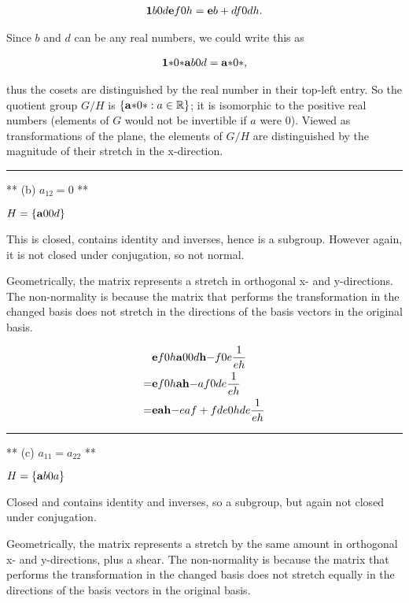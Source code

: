 \begin{align*}
\mathbf{1}{b}
    {0}{d} \mathbf{e}{f}
               {0}{h} = \mathbf{e}{b + df}
                            {0}{dh    }.
\end{align*}

Since $b$ and $d$ can be any real numbers, we could write this as

\begin{align*}
\mathbf{1}{*}
    {0}{*} \mathbf{a}{b}
               {0}{d} = \mathbf{a}{*}
                            {0}{*},
\end{align*}

thus the cosets are distinguished by the real number in their top-left
entry. So the quotient group $G/H$ is $\left\{\tiny{\mathbf{a}{*}{0}{*}}: a \in
\mathbb{R}\right\}$; it is isomorphic to the positive real numbers (elements of $G$
would not be invertible if $a$ were $0$). Viewed as transformations of the
plane, the elements of $G/H$ are distinguished by the magnitude of their
stretch in the x-direction.

\hrule
** (b) $a_{12} = 0$ **

$H = \left\{ \mathbf{a}{0}
                 {0}{d} \right\}$

This is closed, contains identity and inverses, hence is a subgroup. However
again, it is not closed under conjugation, so not normal.

Geometrically, the matrix represents a stretch in orthogonal x- and
y-directions. The non-normality is because the matrix that performs the
transformation in the changed basis does not stretch in the directions of the
basis vectors in the original basis.

\begin{align*}
&\mathbf{e}{f}
     {0}{h} \mathbf{a}{0}
                {0}{d} \mathbf{h}{-f}
                           {0}{e } \frac{1}{eh} \\
= &\mathbf{e}{f}
       {0}{h} \mathbf{ah}{-af}
                  {0 }{de } \frac{1}{eh} \\
= &\mathbf{eah}{-eaf + fde}
       {0  }{hde       } \frac{1}{eh}
\end{align*}

\hrule
** (c) $a_{11} = a_{22}$ **

$H = \left\{ \mathbf{a}{b}
                 {0}{a} \right\}$

Closed and contains identity and inverses, so a subgroup, but again not closed
under conjugation.

Geometrically, the matrix represents a stretch by the same amount in orthogonal
x- and y-directions, plus a shear. The non-normality is because the matrix that
performs the transformation in the changed basis does not stretch equally in
the directions of the basis vectors in the original basis.

